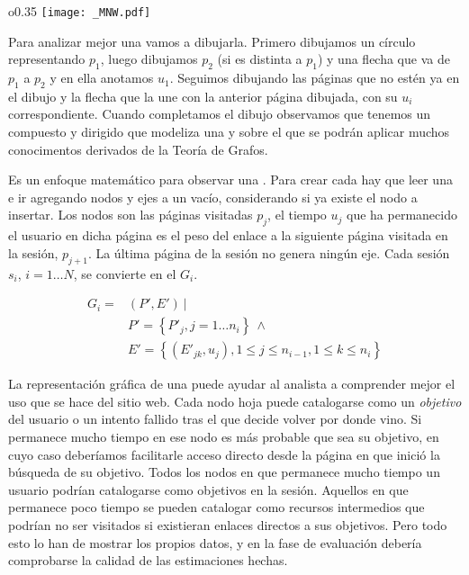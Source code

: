 \begin{wrapfigure}{o}{0.35\textwidth}
  \centering
  \texttt{[image: \_MNW.pdf]}
	\caption{\Sn}
	\label{fig:1-3-1-SN}
\end{wrapfigure}
Para analizar mejor una \sn vamos a dibujarla. Primero dibujamos un círculo representando $p_1$, luego dibujamos $p_2$ (si es distinta a $p_1$) y una flecha que va de $p_1$ a $p_2$ y en ella anotamos $u_1$. Seguimos dibujando las páginas que no estén ya en el dibujo y la flecha que la une con la anterior página dibujada, con su $u_i$ correspondiente. Cuando completamos el dibujo observamos que tenemos un \grafo compuesto y dirigido que modeliza una \sn y sobre el que se podrán aplicar muchos conocimentos derivados de la Teoría de Grafos.

Es un enfoque matemático para observar una \secuencia. Para crear cada \grafo hay que leer una \sn e ir agregando nodos y ejes a un \grafo vacío, considerando si ya existe el nodo a insertar. Los nodos son las páginas visitadas $p_j$, el tiempo $u_j$ que ha permanecido el usuario en dicha página es el peso del enlace a la siguiente página visitada en la sesión, $p_{j+1}$. La última página de la sesión no genera ningún eje. Cada sesión $s_i$, $i = 1 \ldots N$, se convierte en el \grafo $G_i$.

\begin{equation}\label{eq:1-3-1-grafoSesion}
   \begin{array}{ll}
      G_i = & \left( P', E' \right) \ | \\
            & P' = \left\{ P'_j, j = 1\ldots n_i \right\} \ \wedge \\
            & E' = \left\{ \left( E'_{jk}, u_j \right), 1 \leq j \leq n_{i-1}, 1 \leq k \leq n_i \right\} 
   \end{array}
\end{equation}

La representación gráfica de una \sn puede ayudar al analista a comprender mejor el uso que se hace del sitio web. Cada nodo hoja puede catalogarse como un \emph{objetivo} del usuario o un intento fallido tras el que decide volver por donde vino. Si permanece mucho tiempo en ese nodo es más probable que sea su objetivo, en cuyo caso deberíamos facilitarle acceso directo desde la página en que inició la búsqueda de su objetivo. Todos los nodos en que permanece mucho tiempo un usuario podrían catalogarse como objetivos en la sesión. Aquellos en que permanece poco tiempo se pueden catalogar como recursos intermedios que podrían no ser visitados si existieran enlaces directos a sus objetivos. Pero todo esto lo han de mostrar los propios datos, y en la fase de evaluación debería comprobarse la calidad de las estimaciones hechas.



